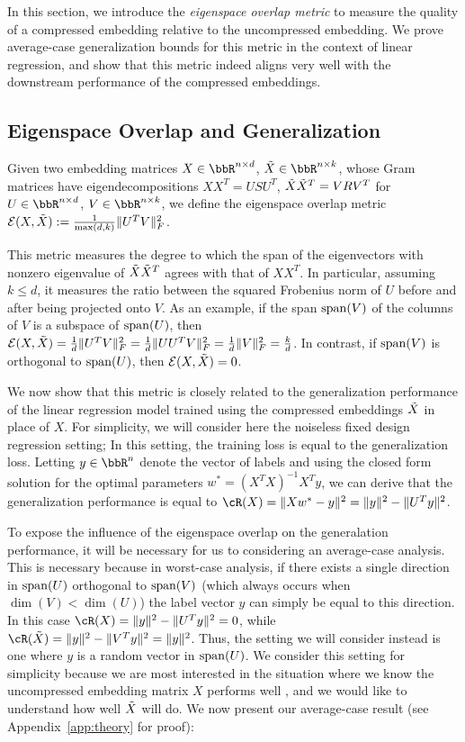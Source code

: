 In this section, we introduce the \textit{eigenspace overlap metric} to measure the quality of a compressed embedding relative to the uncompressed embedding.
We prove average-case generalization bounds for this metric in the context of linear regression, and show that this metric indeed aligns very well with the downstream performance of the compressed embeddings.

\subsection{Eigenspace Overlap and Generalization}
\label{subsec:eigen_overlap}
\begin{definition}
Given two embedding matrices $X \in \RR^{n \times d}$, $\tX \in \RR^{n \times k}$, whose Gram matrices have eigendecompositions $XX^T = USU^T$, $\tX\tX^T = VRV^T$ for $U \in \RR^{n\times d}$, $V\in \RR^{n \times k}$, we define the eigenspace overlap metric $\eigover(X,\tX) \defeq  \frac{1}{\max(d,k)}\|U^T V\|_F^2$.
\end{definition}

This metric measures the degree to which the span of the eigenvectors with nonzero eigenvalue of $\tX\tX^T$ agrees with that of $XX^T$.
In particular, assuming $k\leq d$, it measures the ratio between the squared Frobenius norm of $U$ before and after being projected onto $V$.
As an example, if the span $\Span(V)$ of the columns of $V$ is a subspace of $\Span(U)$, then $\eigover(X,\tX) = \frac{1}{d}\|U^T V\|_F^2 = \frac{1}{d}\|UU^T V\|_F^2 = \frac{1}{d}\|V\|_F^2 = \frac{k}{d}$.
In contrast, if $\Span(V)$ is orthogonal to $\Span(U)$, then $\eigover(X,\tX) = 0$.

We now show that this metric is closely related to the generalization performance of the linear regression model trained using the compressed embeddings $\tX$ in place of $X$.
For simplicity, we will consider here the noiseless fixed design regression setting;
In this setting, the training loss is equal to the generalization loss.
Letting $y\in\RR^n$ denote the vector of labels and using the closed form solution for the optimal parameters $w^* = (X^T X)^{-1}X^Ty$, we can derive that the generalization performance is equal to $\cR(X) = \|Xw^* - y\|^2 = \|y\|^2 - \|U^T y\|^2$.

To expose the influence of the eigenspace overlap on the generalation performance, it will be necessary for us to considering an average-case analysis.
This is necessary because in worst-case analysis, if there exists a single direction in $\Span(U)$ orthogonal to $\Span(V)$ (which always occurs when $\dim(V) < \dim(U)$) the label vector $y$ can simply be equal to this direction.
In this case $\cR(X) = \|y\|^2 - \|U^T y\|^2 = 0$, while $\cR(\tX) = \|y\|^2 - \|V^T y\|^2 = \|y\|^2$.
Thus, the setting we will consider instead is one where $y$ is a random vector in $\Span(U)$.
We consider this setting for simplicity because we are most interested in the situation where we know the uncompressed embedding matrix $X$ performs well , and we would like to understand how well $\tX$ will do.
We now present our average-case result (see Appendix~\ref{app:theory} for proof):

